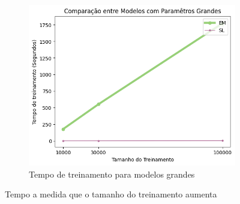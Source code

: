 \documentclass{subfiles}
\begin{document}
\begin{figure}
    \hfill
    \begin{subfigure}[b]{0.3\linewidth}
        \centering
        \includegraphics[width=\linewidth]{Figures/resultados/large_time}
        \caption{Tempo de treinamento para modelos grandes}
    \end{subfigure}
       \caption{Tempo a medida que o tamanho do treinamento aumenta }
       \label{fig:time}
\end{figure}
\end{document}
